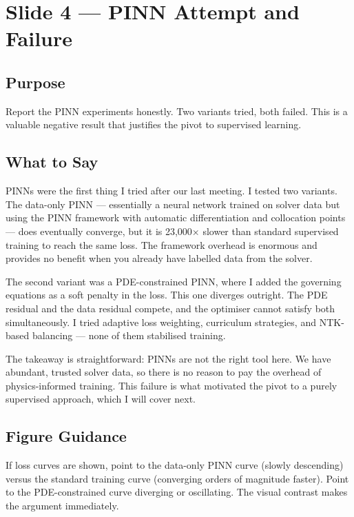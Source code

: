 \documentclass[12pt,a4paper]{article}
\begin{document}
\section{Slide 4 --- PINN Attempt and Failure}
\label{sec:slide4}

\subsection*{Purpose}
Report the PINN experiments honestly. Two variants tried, both
failed. This is a valuable negative result that justifies the
pivot to supervised learning.

\subsection*{What to Say}

PINNs were the first thing I tried after our last meeting.
I tested two variants. The data-only PINN --- essentially a neural
network trained on solver data but using the PINN framework with
automatic differentiation and collocation points --- does
eventually converge, but it is 23,000$\times$ slower than standard
supervised training to reach the same loss. The framework overhead
is enormous and provides no benefit when you already have labelled
data from the solver.

The second variant was a PDE-constrained PINN, where I added the
governing equations as a soft penalty in the loss. This one
diverges outright. The PDE residual and the data residual compete,
and the optimiser cannot satisfy both simultaneously. I tried
adaptive loss weighting, curriculum strategies, and NTK-based
balancing --- none of them stabilised training.

The takeaway is straightforward: PINNs are not the right tool
here. We have abundant, trusted solver data, so there is no reason
to pay the overhead of physics-informed training. This failure is
what motivated the pivot to a purely supervised approach, which I
will cover next.

\subsection*{Figure Guidance}
If loss curves are shown, point to the data-only PINN curve (slowly
descending) versus the standard training curve (converging orders of
magnitude faster). Point to the PDE-constrained curve diverging or
oscillating. The visual contrast makes the argument immediately.
\end{document}
